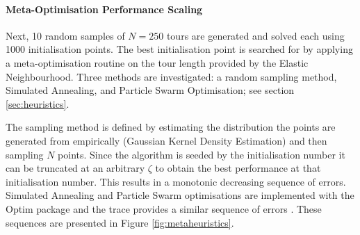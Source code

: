\paragraph{Meta-Optimisation Performance Scaling}
Next, 10 random samples of $N = 250$ tours are generated and solved each using 1000 initialisation points. The best initialisation point is searched for by applying a meta-optimisation routine on the tour length provided by the Elastic Neighbourhood. Three methods are investigated: a random sampling method, Simulated Annealing, and Particle Swarm Optimisation; see section \ref{sec:heuristics}. 

The sampling method is defined by estimating the distribution the points are generated from empirically (Gaussian Kernel Density Estimation) and then sampling $N$ points. Since the algorithm is seeded by the initialisation number it can be truncated at an arbitrary $\zeta$ to obtain the best performance at that initialisation number. This results in a monotonic decreasing sequence of errors. Simulated Annealing and Particle Swarm optimisations are implemented with the Optim package and the trace provides a similar sequence of errors \cite{Mogensen2018}. These sequences are presented in Figure \ref{fig:metaheuristics}.  

